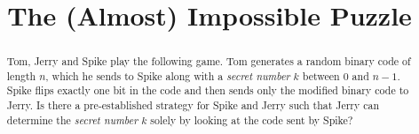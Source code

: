 \documentclass[11pt,a4paper]{amsart}
\title{The (Almost) Impossible Puzzle}
\begin{document}
\begin{abstract}
Tom, Jerry and Spike play the following game.
Tom generates a random binary code of length $n$,
which he sends to Spike along with a \textit{secret number} $k$
between 0 and $n-1$. Spike flips exactly one bit in the code
and then sends only the modified binary code to Jerry.
Is there a pre-established strategy for Spike and Jerry
such that Jerry can determine the \textit{secret number} $k$
solely by looking at the code sent by Spike?
\end{abstract}

\maketitle

\bigskip


















\end{document}
